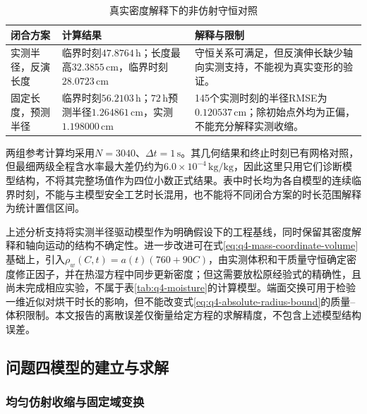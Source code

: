 \documentclass[withoutpreface,bwprint]{cumcmthesis}
\begin{document}
\begin{table}[H]
\centering
\small
\renewcommand{\arraystretch}{1.2}
\caption{真实密度解释下的非仿射守恒对照}
\label{tab:q4-closure-comparison}
\begin{tabularx}{\textwidth}{>{\raggedright\arraybackslash}p{} >{\raggedright\arraybackslash}X >{\raggedright\arraybackslash}X}
\hline
闭合方案 & 计算结果 & 解释与限制\\
\hline
实测半径，反演长度 & 临界时刻$47.8764\,\mathrm h$；长度最高$32.3855\,\mathrm{cm}$，临界时刻$28.0723\,\mathrm{cm}$ & 守恒关系可满足，但反演伸长缺少轴向实测支持，不能视为真实变形的验证。\\
固定长度，预测半径 & 临界时刻$56.2103\,\mathrm h$；$72\,\mathrm h$预测半径$1.264861\,\mathrm{cm}$，实测$1.198000\,\mathrm{cm}$ & 145个实测时刻的半径RMSE为$0.120537\,\mathrm{cm}$；除初始点外均为正偏，不能充分解释实测收缩。\\
\hline
\end{tabularx}
\end{table}

两组参考计算均采用$N=3040$、$\Delta t=1\,\mathrm s$。其几何结果和终止时刻已有网格对照，但最细两级全程含水率最大差仍约为$6.0\times10^{-4}\,\mathrm{kg/kg}$，因此这里只用它们诊断模型结构，不将其完整场值作为四位小数正式结果。表中时长均为各自模型的连续临界时刻，不能与主模型安全工艺时长混用，也不能将不同闭合方案的时长范围解释为统计置信区间。

上述分析支持将实测半径驱动模型作为明确假设下的工程基线，同时保留其密度解释和轴向运动的结构不确定性。进一步改进可在式\eqref{eq:q4-mass-coordinate-volume}基础上，引入$\rho_w(C,t)=a(t)(760+90C)$，由实测体积和干质量守恒确定密度修正因子，并在热湿方程中同步更新密度；但这需要放松原经验式的精确性，且尚未完成相应实验，不属于表\ref{tab:q4-moisture}的计算模型。端面交换可用于检验一维近似对烘干时长的影响，但不能改变式\eqref{eq:q4-absolute-radius-bound}的质量--体积限制。本文报告的离散误差仅衡量给定方程的求解精度，不包含上述模型结构误差。
\fi

\subsection{问题四模型的建立与求解}

\subsubsection{均匀仿射收缩与固定域变换}
\end{document}
